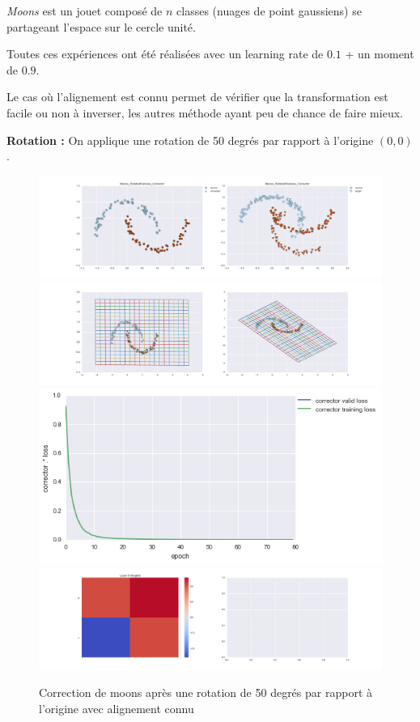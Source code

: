 

\emph{Moons} est un jouet composé de $n$ classes (nuages de point gaussiens) se partageant 
l'espace sur le cercle unité.

Toutes ces expériences ont été réalisées avec un learning rate de $0.1$ + un moment de $0.9$.


Le cas où l'alignement est connu permet de vérifier que la transformation est facile ou non 
à inverser, les autres méthode ayant peu de chance de faire mieux.

{\Large \textbf{Rotation :}} On applique une rotation de 50 degrés par rapport à l'origine $(0,0)$.

\begin{figure}[H] %
\centering
\includegraphics[width=\linewidth]{fig/24-05-2016/moons/Moons_RotatedPairwise_Corrector-DATA.png}
\includegraphics[width=\linewidth]{fig/24-05-2016/moons/Moons_RotatedPairwise_Corrector-GridCheck.png}
\includegraphics[width=0.45\linewidth]{fig/24-05-2016/moons/Moons_RotatedPairwise_Corrector-Learning_curve.png}
\includegraphics[width=\linewidth]{fig/24-05-2016/moons/Moons_RotatedPairwise_Corrector-W.png}
\caption{Correction de moons après une rotation de 50 degrés par rapport à l'origine avec alignement connu}
\label{fig:recap-moons-rot-pairwise}
\end{figure}

